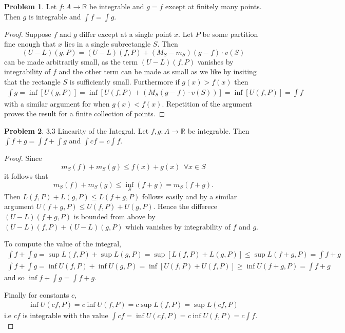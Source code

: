 \documentclass[20pt]{article}
\theoremstyle{plain}
\theoremstyle{definition}
\newtheorem*{problem}{Problem}
\newcommand{\reals}{\mathbb{R}}
\begin{document}
\begin{problem}{3.2}
  Let $f: A \to \reals$ be integrable and $g = f$ except at finitely many points.
  Then $g$ is integrable and $\int f = \int g.$
\end{problem}

\begin{proof}
  Suppose $f$ and $g$ differ except at a single point $x$.
  Let $P$ be some partition fine enough that $x$ lies in a single
  subrectangle $S$. Then
  $$(U-L)(g, P) = (U-L)(f, P) + (M_S-m_S)(g-f)\cdot v(S)$$
  can be made arbitrarily small, as the term $(U-L)(f, P)$ vanishes by
  integrability of $f$ and the other term can be made as small
  as we like by insiting that the rectangle $S$ is sufficiently small.
  Furthermore if $g(x) > f(x)$ then
  \begin{align*}
    \int g = \inf [U(g, P)] = \inf[ U(f, P) + (M_S(g - f)\cdot v(S))] = \inf[U(f, P)] = \int f
  \end{align*}
  with a similar argument for when $g(x) < f(x).$
  Repetition of the argument proves the result for a finite collection of
  points.
\end{proof}


\begin{problem}{3.3 Linearity of the Integral.}
  Let $f, g: A \to \reals$ be integrable.
  Then $\int f+g  = \int f + \int g$ and $\int cf =c\int f$.
\end{problem}

\begin{proof}
  Since
  $$m_S(f) + m_S(g) \leq f(x) + g(x) \ \ \forall x \in S$$
  it follows that
  $$m_S(f) + m_S(g) \leq \inf_{S}(f + g) = m_S(f + g).$$
  Then $L(f, P) + L(g, P) \leq L(f + g, P)$ follows easily and by a similar argument
  $U(f + g, P) \leq U(f, P) + U(g, P).$  Hence the differece
  $(U-L)(f + g, P)$ is bounded from above by $(U-L)(f, P) + (U-L)(g, P)$
  which vanishes by integrability of $f$ and $g$.

  To compute the value of the integral,
  \begin{align*}
    \int f + \int g = \sup L(f, P) + \sup L(g, P) = \sup[ L(f, P) + L(g, P) ]
    \leq \sup L (f + g, P) = \int f + g \\
    \int f + \int g = \inf U(f, P) + \inf U(g, P) = \inf[ U(f, P) + U(f, P) ]
    \geq \inf U(f + g, P) = \int f + g
  \end{align*}
  and so $\inf f + \int g = \int f + g.$

  Finally for constants $c$,
  \begin{align*}
    \inf U(cf, P) = c \inf U(f, P) = c \sup L(f, P) = \sup L(cf, P)
  \end{align*}
  i.e $cf$ is integrable with the value
  $\int cf = \inf U(cf, P) = c \inf U(f, P) = c \int f.$
\end{proof}
\end{document}
